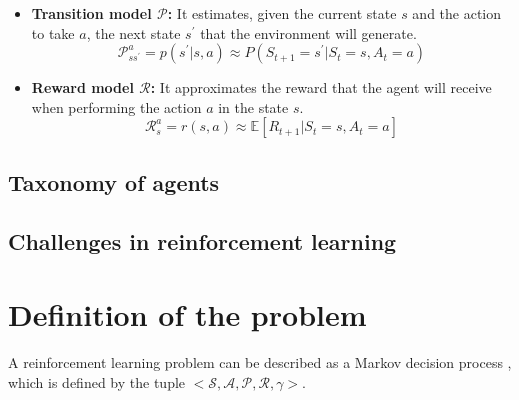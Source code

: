 \begin{itemize}
    \item \textbf{Transition model $\mathcal{P}$:} It estimates, given the current state $s$ and the action to take $a$, the next state $s^\prime$ that the environment will generate.
    \begin{equation}
        \mathcal{P}^a_{ss^\prime} = p(s^\prime|s,a) \approx P(S_{t+1} = s^\prime|S_t = s, A_t = a)
    \end{equation}
    \item \textbf{Reward model $\mathcal{R}$:} It approximates the reward that the agent will receive when performing the action $a$ in the state $s$.
    \begin{equation}
        \mathcal{R}^a_s = r(s,a) \approx \mathbb{E}[R_{t+1}| S_t = s, A_t = a]
    \end{equation}
\end{itemize}

\subsection{Taxonomy of agents}

\subsection{Challenges in reinforcement learning}
\label{sec:challenges}

\section{Definition of the problem}

A reinforcement learning problem can be described as a Markov decision process \cite{unk}, which is defined by the tuple $<\mathcal{S}, \mathcal{A},\mathcal{P},\mathcal{R},\gamma>$.

